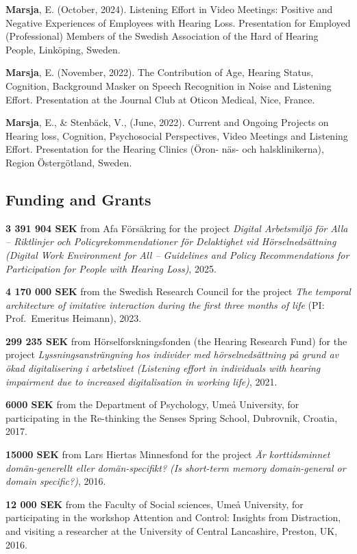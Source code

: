 \documentclass[]{article}
\begin{document}
\textbf{Marsja}, E. (October, 2024). Listening Effort in Video Meetings:
Positive and Negative Experiences of Employees with Hearing Loss.
Presentation for Employed (Professional) Members of the Swedish
Association of the Hard of Hearing People, Linköping, Sweden.

\textbf{Marsja}, E. (November, 2022). The Contribution of Age, Hearing
Status, Cognition, Background Masker on Speech Recognition in Noise and
Listening Effort. Presentation at the Journal Club at Oticon Medical,
Nice, France.

\textbf{Marsja}, E., \& Stenbäck, V., (June, 2022). Current and Ongoing
Projects on Hearing loss, Cognition, Psychosocial Perspectives, Video
Meetings and Listening Effort. Presentation for the Hearing Clinics
(Öron- näs- och halsklinikerna), Region Östergötland, Sweden.

\subsection{Funding and Grants}\label{funding-and-grants}

\textbf{3 391 904 SEK} from Afa Försäkring for the project \emph{Digital
Arbetsmiljö för Alla -- Riktlinjer och Policyrekommendationer för
Delaktighet vid Hörselnedsättning (Digital Work Environment for All --
Guidelines and Policy Recommendations for Participation for People with
Hearing Loss)}, 2025.

\textbf{4 170 000 SEK} from the Swedish Research Council for the project
\emph{The temporal architecture of imitative interaction during the
first three months of life} (PI: Prof.~Emeritus Heimann), 2023.

\textbf{299 235 SEK} from Hörselforskningsfonden (the Hearing Research
Fund) for the project \emph{Lyssningsansträngning hos individer med
hörselnedsättning på grund av ökad digitalisering i arbetslivet
(Listening effort in individuals with hearing impairment due to
increased digitalisation in working life)}, 2021.

\textbf{6000 SEK} from the Department of Psychology, Umeå University,
for participating in the Re-thinking the Senses Spring School,
Dubrovnik, Croatia, 2017.

\textbf{15000 SEK} from Lars Hiertas Minnesfond for the project \emph{Är
korttidsminnet domän-generellt eller domän-specifikt? (Is short-term
memory domain-general or domain specific?)}, 2016.

\textbf{12 000 SEK} from the Faculty of Social sciences, Umeå
University, for participating in the workshop Attention and Control:
Insights from Distraction, and visiting a researcher at the University
of Central Lancashire, Preston, UK, 2016.
\end{document}
